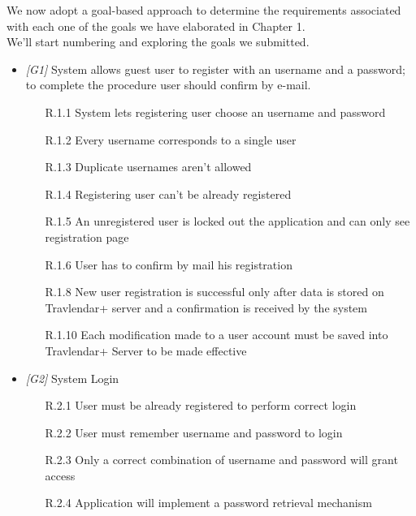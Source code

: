 We now adopt a goal-based approach to determine the requirements associated with each one of the goals we have elaborated in Chapter 1.\\
We'll start numbering and exploring the goals we submitted.

\begin{itemize}
	\item \textit{[G1]} 
		System allows guest user to register with an username and a password; to complete the procedure user should confirm by e-mail.
               
                  \begin{itemize}
                        \item [R.1.1] System lets registering user choose an username and password
                        \item [R.1.2] Every username corresponds to a single user
                        \item [R.1.3] Duplicate usernames aren’t allowed
                        \item [R.1.4] Registering user can't be already registered
                        \item [R.1.5] An unregistered user is locked out the application and can only see registration page
                        \item [R.1.6] User has to confirm by mail his registration
                        \item [R.1.8] New user registration is successful only after data is stored on Travlendar+ server and a confirmation is received by the system
                        \item [R.1.10] Each modification made to a user account must be saved into Travlendar+ Server to be made effective
                  \end{itemize}
             
\item \textit{[G2]} System Login

                  \begin{itemize}
                        \item [R.2.1] User must be already registered to perform correct login
                        \item [R.2.2] User must remember username and password to login
                        \item [R.2.3] Only a correct combination of username and password will grant access
                        \item [R.2.4] Application will implement a password retrieval mechanism
                  \end{itemize}
                  

\end{itemize}

